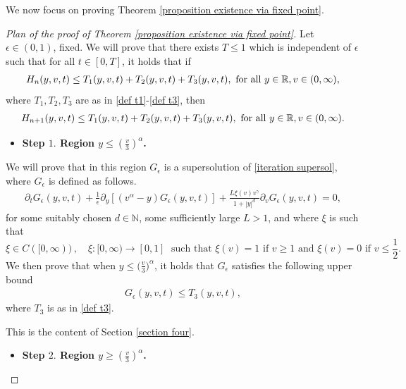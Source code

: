 \documentclass[11pt]{article}
\numberwithin{equation}{section}
\begin{document}
We now focus on proving Theorem \ref{proposition existence via fixed point}.
\begin{proof}[Plan of the proof of Theorem \ref{proposition existence via fixed point}]
Let $\epsilon\in(0,1)$, fixed. We will prove that there exists $T\leq 1$ which is independent of $\epsilon$ such that for all $t\in[0,T]$, it holds that if 
\begin{align*}
H_{n}(y,v,t)\leq T_{1}(y,v,t)+T_{2}(y,v,t)+T_{3}(y,v,t), \textup{ for all } y\in\mathbb{R}, v\in(0,\infty),
\end{align*}
where $T_{1},T_{2},T_{3}$ are as in \eqref{def t1}-\eqref{def t3}, then
\begin{align}\label{main bound hn}
H_{n+1}(y,v,t)\leq T_{1}(y,v,t)+T_{2}(y,v,t)+T_{3}(y,v,t), \textup{ for all } y\in\mathbb{R}, v\in(0,\infty).
\end{align}
\begin{itemize}
    \item \textbf{Step $1.$ Region $ y\leq (\frac{v}{3})^{\alpha}$.} 
\end{itemize}
We will prove that in this region $G_{\epsilon}$ is a supersolution of \eqref{iteration supersol}, where $G_{\epsilon}$ is defined as follows. 
\begin{align*}
  \partial_{t}G_{\epsilon}(y,v,t)+\frac{1}{\epsilon}\partial_{y}[(v^{\alpha}-y)G_{\epsilon}(y,v,t)]+\frac{L\xi(v)v^{\gamma}}{1+|y|^{d}}\partial_{v}G_{\epsilon}(y,v,t)=0,
  \end{align*}
  for some suitably chosen $d\in\mathbb{N}$, some sufficiently large $L>1$, and where $\xi$ is such that
  \begin{equation}
\xi\in C([0,\infty))\,, \quad \xi\colon [0,\infty)\rightarrow [0,1] \; \mbox{ such that } \xi(v)=1
\mbox{ if } v\geq 1 \mbox{ and } \xi(v)=0 \mbox{ if } v\leq \frac{1}{2}.
\end{equation}
We then prove that when $y\leq \big(\frac{v}{3}\big)^{\alpha}$, it holds that $G_{\epsilon}$ satisfies the following upper bound
\begin{align}
 G_{\epsilon}(y,v,t)\leq T_{3}(y,v,t),
\end{align}
where $T_{3}$ is as in \eqref{def t3}.

This is the content of Section \ref{section four}.

\begin{itemize}
    \item \textbf{Step $2.$ Region $ y\geq (\frac{v}{3})^{\alpha}$.} 
\end{itemize}


\end{proof}
\end{document}
